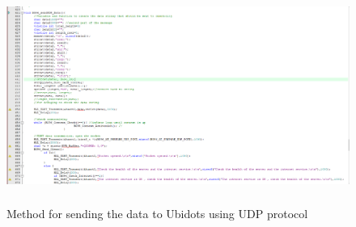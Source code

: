 \documentclass[12pt]{article}
\begin{document}
\begin{figure}[H]
    \centering
    \includegraphics[width=\columnwidth,height=7cm,keepaspectratio]{Images/uvision/BG96_sendData.png}
    \caption{Method for sending the data to Ubidots using UDP protocol}

\end{figure}


\newpage
\end{document}
